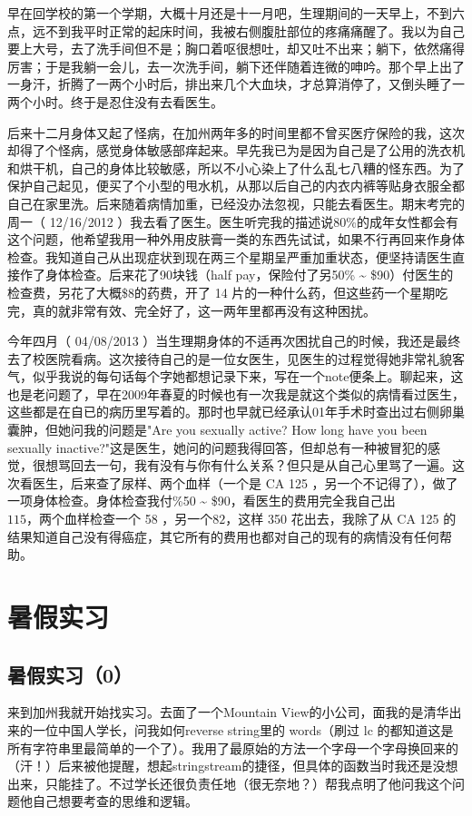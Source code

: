 \documentclass[12pt]{book}
\begin{document}
早在回学校的第一个学期，大概十月还是十一月吧，生理期间的一天早上，不到六点，远不到我平时正常的起床时间，我被右侧腹肚部位的疼痛痛醒了。我以为自己要上大号，去了洗手间但不是；胸口着呕很想吐，却又吐不出来；躺下，依然痛得厉害；于是我躺一会儿，去一次洗手间，躺下还伴随着连微的呻吟。那个早上出了一身汗，折腾了一两个小时后，排出来几个大血块，才总算消停了，又倒头睡了一两个小时。终于是忍住没有去看医生。

后来十二月身体又起了怪病，在加州两年多的时间里都不曾买医疗保险的我，这次却得了个怪病，感觉身体敏感部痒起来。早先我已为是因为自己是了公用的洗衣机和烘干机，自己的身体比较敏感，所以不小心染上了什么乱七八糟的怪东西。为了保护自己起见，便买了个小型的甩水机，从那以后自己的内衣内裤等贴身衣服全都自己在家里洗。后来随着病情加重，已经没办法忽视，只能去看医生。期末考完的周一（ 12/16/2012 ）我去看了医生。医生听完我的描述说80\%的成年女性都会有这个问题，他希望我用一种外用皮肤膏一类的东西先试试，如果不行再回来作身体检查。我知道自己从出现症状到现在两三个星期呈严重加重状态，便坚持请医生直接作了身体检查。后来花了90块钱（half pay，保险付了另50\%  \textasciitilde{} \$90）付医生的检查费，另花了大概\$8的药费，开了 14 片的一种什么药，但这些药一个星期吃完，真的就非常有效、完全好了，这一两年里都再没有这种困扰。

今年四月（ 04/08/2013 ）当生理期身体的不适再次困扰自己的时候，我还是最终去了校医院看病。这次接待自己的是一位女医生，见医生的过程觉得她非常礼貌客气，似乎我说的每句话每个字她都想记录下来，写在一个note便条上。聊起来，这也是老问题了，早在2009年春夏的时候也有一次我是就这个类似的病情看过医生，这些都是在自已的病历里写着的。那时也早就已经承认01年手术时查出过右侧卵巢囊肿，但她问我的问题是"Are you sexually active? How long have you been sexually inactive?"这是医生，她问的问题我得回答，但却总有一种被冒犯的感觉，很想骂回去一句，我有没有与你有什么关系？但只是从自己心里骂了一遍。这次看医生，后来查了尿样、两个血样（一个是 CA 125 ，另一个不记得了），做了一项身体检查。身体检查我付\%50 \textasciitilde{} \$90，看医生的费用完全我自己出$115，两个血样检查一个$ 58 ，另一个$82，这样$ 350 花出去，我除了从 CA 125 的结果知道自己没有得癌症，其它所有的费用也都对自己的现有的病情没有任何帮助。


\chapter{暑假实习}
\label{sec-5}
\section{暑假实习（0）}
\label{sec-5-1}
来到加州我就开始找实习。去面了一个Mountain View的小公司，面我的是清华出来的一位中国人学长，问我如何reverse string里的 words（刷过 lc 的都知道这是所有字符串里最简单的一个了）。我用了最原始的方法一个字母一个字母换回来的（汗！）后来被他提醒，想起stringstream的捷径，但具体的函数当时我还是没想出来，只能挂了。不过学长还很负责任地（很无奈地？）帮我点明了他问我这个问题他自己想要考查的思维和逻辑。
\end{document}
